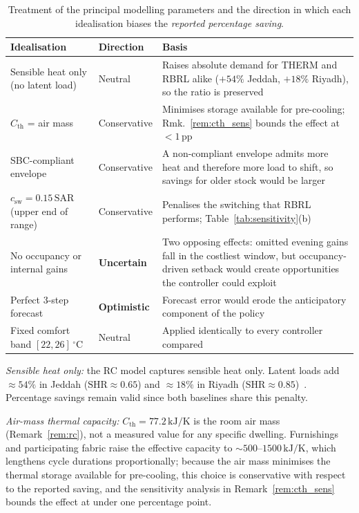\documentclass[3p,number]{elsarticle}
\newcommand{\Cth}{C_{\mathrm{th}}}
\newcommand{\csw}{c_{\mathrm{sw}}}
\newcommand{\SAR}{\text{SAR}}
\begin{document}
\begin{table}[!t]
\centering
\caption{Treatment of the principal modelling parameters and the direction in
which each idealisation biases the \emph{reported percentage saving}.}
\label{tab:bias}
\setlength{\tabcolsep}{4pt}
\begin{tabularx}{\columnwidth}{@{}XlX@{}}
\toprule
Idealisation & Direction & Basis \\
\midrule
Sensible heat only (no latent load) & Neutral & Raises absolute demand for THERM and RBRL alike ($+54\%$ Jeddah, $+18\%$ Riyadh), so the ratio is preserved \\
$\Cth$ = air mass & Conservative & Minimises storage available for pre-cooling; Rmk.~\ref{rem:cth_sens} bounds the effect at $<1$\,pp \\
SBC-compliant envelope & Conservative & A non-compliant envelope admits more heat and therefore more load to shift, so savings for older stock would be larger \\
$\csw=0.15\,\SAR$ (upper end of range) & Conservative & Penalises the switching that RBRL performs; Table~\ref{tab:sensitivity}(b) \\
No occupancy or internal gains & \textbf{Uncertain} & Two opposing effects: omitted evening gains fall in the costliest window, but occupancy-driven setback would create opportunities the controller could exploit \\
Perfect 3-step forecast & \textbf{Optimistic} & Forecast error would erode the anticipatory component of the policy \\
Fixed comfort band $[22,26]\,^\circ$C & Neutral & Applied identically to every controller compared \\
\bottomrule
\end{tabularx}
\end{table}
 
\emph{Sensible heat only:} the RC model captures sensible heat only.
Latent loads add ${\approx}54\%$ in Jeddah ($\text{SHR}\approx0.65$) and ${\approx}18\%$ in Riyadh ($\text{SHR}\approx0.85$)~\cite{Rodrigues2025}.
Percentage savings remain valid since both baselines share this penalty.
 
\emph{Air-mass thermal capacity:} $\Cth{=}77.2\,\text{kJ/K}$ is the room air mass (Remark~\ref{rem:rc}), not a measured value for any specific dwelling. Furnishings and participating fabric raise the effective capacity to ${\sim}500$--$1500\,\text{kJ/K}$, which lengthens cycle durations proportionally; because the air mass minimises the thermal storage available for pre-cooling, this choice is conservative with respect to the reported saving, and the sensitivity analysis in Remark~\ref{rem:cth_sens} bounds the effect at under one percentage point.
 
\end{document}
